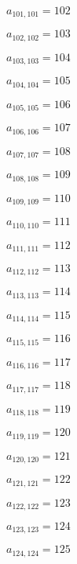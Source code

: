 \documentclass[a4paper,12pt]{article}
\begin{document}
$a _{ 101, 101 } = 102$

$a _{ 102, 102 } = 103$

$a _{ 103, 103 } = 104$

$a _{ 104, 104 } = 105$

$a _{ 105, 105 } = 106$

$a _{ 106, 106 } = 107$

$a _{ 107, 107 } = 108$

$a _{ 108, 108 } = 109$

$a _{ 109, 109 } = 110$

$a _{ 110, 110 } = 111$

$a _{ 111, 111 } = 112$

$a _{ 112, 112 } = 113$

$a _{ 113, 113 } = 114$

$a _{ 114, 114 } = 115$

$a _{ 115, 115 } = 116$

$a _{ 116, 116 } = 117$

$a _{ 117, 117 } = 118$

$a _{ 118, 118 } = 119$

$a _{ 119, 119 } = 120$

$a _{ 120, 120 } = 121$

$a _{ 121, 121 } = 122$

$a _{ 122, 122 } = 123$

$a _{ 123, 123 } = 124$

$a _{ 124, 124 } = 125$
\end{document}
